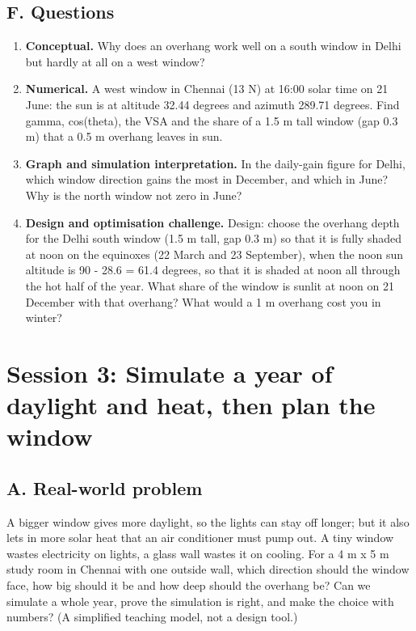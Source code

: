 \documentclass[11pt,a4paper]{article}
\begin{document}
\subsection*{F. Questions}
\begin{enumerate}[nosep]
\item \textbf{Conceptual.} Why does an overhang work well on a south window in Delhi but hardly at all on a west window?
\item \textbf{Numerical.} A west window in Chennai (13 N) at 16:00 solar time on 21 June: the sun is at altitude 32.44 degrees and azimuth 289.71 degrees. Find gamma, cos(theta), the VSA and the share of a 1.5 m tall window (gap 0.3 m) that a 0.5 m overhang leaves in sun.
\item \textbf{Graph and simulation interpretation.} In the daily-gain figure for Delhi, which window direction gains the most in December, and which in June? Why is the north window not zero in June?
\item \textbf{Design and optimisation challenge.} Design: choose the overhang depth for the Delhi south window (1.5 m tall, gap 0.3 m) so that it is fully shaded at noon on the equinoxes (22 March and 23 September), when the noon sun altitude is 90 - 28.6 = 61.4 degrees, so that it is shaded at noon all through the hot half of the year. What share of the window is sunlit at noon on 21 December with that overhang? What would a 1 m overhang cost you in winter?
\end{enumerate}

\section{Session 3: Simulate a year of daylight and heat, then plan the window}

\subsection*{A. Real-world problem}
A bigger window gives more daylight, so the lights can stay off longer; but it also lets in more solar heat that an air conditioner must pump out. A tiny window wastes electricity on lights, a glass wall wastes it on cooling. For a 4 m x 5 m study room in Chennai with one outside wall, which direction should the window face, how big should it be and how deep should the overhang be? Can we simulate a whole year, prove the simulation is right, and make the choice with numbers? (A simplified teaching model, not a design tool.)
\end{document}
